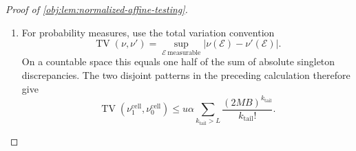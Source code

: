 \documentclass[11pt]{article}
\begin{document}
\begin{proof}[Proof of \cref{obj:lem:normalized-affine-testing}]
\begin{enumerate}
To sum over the counts, use \(1/(\rho+1)!\le1/\rho!\). Coefficientwise, the nonnegative count series obey
\[
\begin{aligned}
\sum_{\rho\ge0}\frac{u^\rho S_1(v)^\rho}{(\rho+1)!}
&\preceq e^{uS_1(v)},\\
\sum_{\gamma\ge0}\frac{w^\gamma S_1(v)^\gamma}{\gamma!}
&=e^{wS_1(v)},\\
\sum_{\kappa\ge0}\frac{M^\kappa S_0(v)^\kappa}{\kappa!}
&=e^{MS_0(v)},
\end{aligned}
\]
where \(\preceq\) means that each coefficient on the left is at most the corresponding coefficient on the right. Thus
\[
0\le a_j^{\mathrm{cnt}}
\le e^{-Mb_0}[v^j]e^{M(S_1(v)+S_0(v))}
=[v^j]e^{Mv}
=\frac{M^j}{j!}.
\]
This calculation cancels the common baseline using
\(S_1(v)+S_0(v)=b_0+v\).
The dominating series is finite:
\[
\sum_{j\ge0}\frac{M^jB^j}{j!}
\sum_{k\ge0}\frac{(MB)^k}{k!}
=e^{2MB}.
\]
Consequently the nonnegative coefficient sums can be interchanged, and the signed discrepancies are absolutely summable. We obtain
\[
\begin{aligned}
\sum_{\rho,\gamma,\kappa\ge0}
|D_{\rho,\gamma,\kappa}^{\mathrm{cnt}}|
&\le
u\alpha\sum_{j\ge0}a_j^{\mathrm{cnt}}B^j
\sum_{\substack{k\ge0\\k+j>L}}\frac{(MB)^k}{k!}\\
&\le
u\alpha\sum_{\substack{j,k\ge0\\j+k>L}}
\frac{(MB)^{j+k}}{j!k!}\\
&=
u\alpha\sum_{k_{\mathrm{tail}}>L}\frac{(2MB)^{k_{\mathrm{tail}}}}{k_{\mathrm{tail}}!}.
\end{aligned}
\]
The last equality uses
\[
\sum_{j=0}^{k_{\mathrm{tail}}}\frac1{j!(k_{\mathrm{tail}}-j)!}=\frac{2^{k_{\mathrm{tail}}}}{k_{\mathrm{tail}}!}.
\]

\item
For probability measures, use the total variation convention
\[
\operatorname{TV}(\nu,\nu')
=\sup_{\mathscr E\ \mathrm{measurable}}
|\nu(\mathscr E)-\nu'(\mathscr E)|.
\]
On a countable space this equals one half of the sum of absolute singleton discrepancies. The two disjoint patterns in the preceding calculation therefore give
\[
\operatorname{TV}(\nu_1^{\mathrm{cell}},\nu_0^{\mathrm{cell}})
\le u\alpha\sum_{k_{\mathrm{tail}}>L}\frac{(2MB)^{k_{\mathrm{tail}}}}{k_{\mathrm{tail}}!}.
\]


\end{enumerate}
\end{proof}
\end{document}
